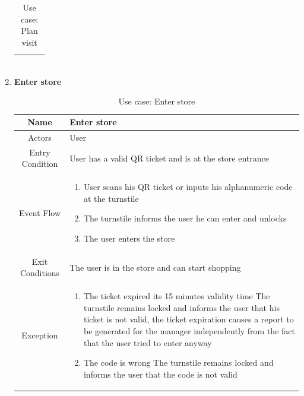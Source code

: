 \begin{enumerate}
\begin{table}[H]
{\begin{tabular}{|c|p{14cm}|}
\begin{enumerate}
		\end{enumerate}\\
		
		\hline
	\end{tabular}
}
	\label{tab:UCPlan}
	\caption{Use case: Plan visit}
\end{table}

\item \textbf{Enter store}

\begin{table}[H]
	{
		\begin{tabular}{|c|p{14cm}|}
			\hline
			Name & Enter store\\
			\hline
			Actors & User\\
			\hline
			Entry Condition & User has a valid QR ticket and is at the store entrance\\
			\hline
			
			Event Flow & \begin{enumerate}
				\item User scans his QR ticket or inputs his alphanumeric code at the turnstile
				\item The turnstile informs the user he can enter and unlocks
				\item The user enters the store
				
			\end{enumerate}\\
			
			\hline
			Exit Conditions & The user is in the store and can start shopping\\
			\hline
			
			Exception & \begin{enumerate}
				\item The ticket expired its 15 minutes validity time\newline
				The turnstile remains locked and informs the user that his ticket is not valid, the ticket expiration causes a report to be generated for the manager independently from the fact that the user tried to enter anyway
				
				\item The code is wrong\newline
				The turnstile remains locked and informs the user that the code is not valid

			\end{enumerate}\\
			
			\hline
		\end{tabular}
	}
	\label{tab:UCEnter}
	\caption{Use case: Enter store}
\end{table}


\end{enumerate}
